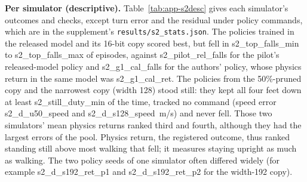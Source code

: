 \textbf{Per simulator (descriptive).} Table~\ref{tab:app-s2desc} gives each simulator's outcomes and checks, except turn error and the residual under policy commands, which are in the supplement's \texttt{results/s2\_stats.json}. The
policies trained in the released model and its 16-bit copy scored best, but fell in {{s2_top_falls_min}} to
{{s2_top_falls_max}} of episodes, against {{s2_pilot_rel_falls}} for the pilot's released-model policy and
{{s2_g1_cal_falls}} for the authors' policy, whose physics return in the same model was {{s2_g1_cal_ret}}. The
policies from the 50\%-pruned copy and the narrowest copy (width 128) stood still: they kept all four feet down at
least {{s2_still_duty_min}} of the time, tracked no command (speed error {{s2_d_u50_speed}} and {{s2_d_s128_speed}}~m/s)
and never fell. Those two simulators' mean physics returns ranked third and fourth, although they had the largest errors of the pool. Physics return, the registered outcome, thus ranked standing still above
most walking that fell; it measures staying upright as much as walking. The two policy seeds of one simulator often
differed widely (for example {{s2_d_s192_ret_p1}} and {{s2_d_s192_ret_p2}} for the width-192 copy).

